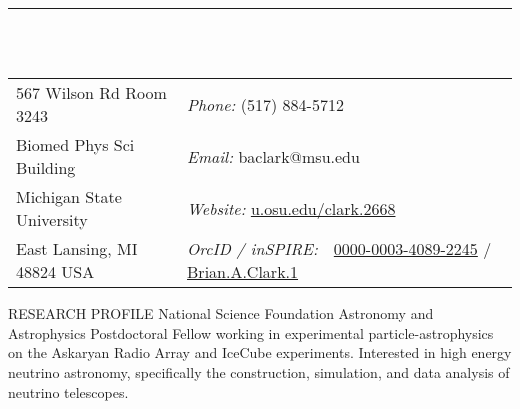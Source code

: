 \documentclass{resume} %
\begin{document}

\vspace{-1cm}
\rule{\textwidth}{0.1cm} \\ \\
\begin{tabular}{@{}p{2in}p{4in}}
567 Wilson Rd Room 3243             & {\it Phone:}  (517) 884-5712 \\            
Biomed Phys Sci Building   & {\it Email:}  baclark@msu.edu
 \\         
Michigan State University & {\it Website:} \url{u.osu.edu/clark.2668} \\       
East Lansing, MI  48824 USA  & {\it OrcID / inSPIRE:} \,\,      \href{https://orcid.org/0000-0003-4089-2245}{0000-0003-4089-2245}  / \href{https://inspirehep.net/author/profile/Brian.A.Clark.1}{Brian.A.Clark.1}\\     
\end{tabular}


\begin{rSection}{RESEARCH PROFILE}
National Science Foundation Astronomy and Astrophysics Postdoctoral Fellow working in experimental particle-astrophysics on the Askaryan Radio Array and IceCube experiments. Interested in high energy neutrino astronomy, specifically the construction, simulation, and data analysis of neutrino telescopes.
\end{rSection}
\end{document}
